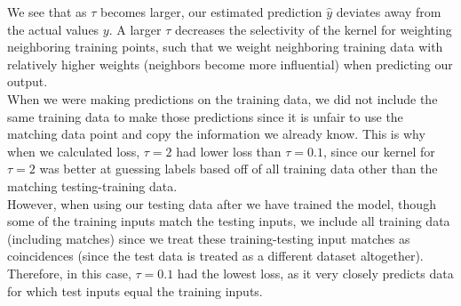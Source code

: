 \documentclass[submit]{harvardml}
\begin{document}
\begin{enumerate}
    We see that as $\tau$ becomes larger, our estimated prediction $\hat{y}$ deviates away from the actual values $y$. A larger $\tau$ decreases the selectivity of the kernel for weighting neighboring training points, such that we weight neighboring training data with relatively higher weights (neighbors become more influential) when predicting our output. \\
    When we were making predictions on the training data, we did not include the same training data to make those predictions since it is unfair to use the matching data point and copy the information we already know. This is why when we calculated loss, $\tau = 2$ had lower loss than $\tau = 0.1$, since our kernel for $\tau = 2$ was better at guessing labels based off of all training data other than the matching testing-training data. \\ 
    However, when using our testing data after we have trained the model, though some of the training inputs match the testing inputs, we include all training data (including matches) since we treat these training-testing input matches as coincidences (since the test data is treated as a different dataset altogether). Therefore, in this case, $\tau = 0.1$ had the lowest loss, as it very closely predicts data for which test inputs equal the training inputs.
\end{enumerate}

\newpage

\end{document}
